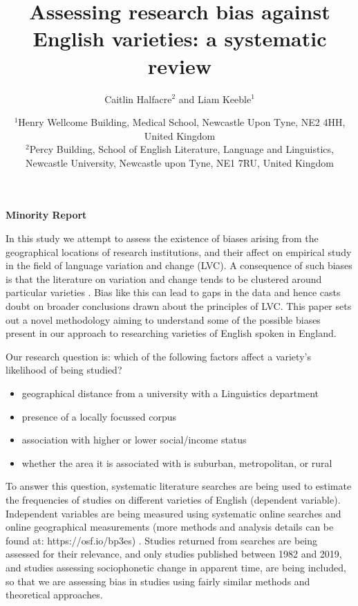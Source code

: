 \documentclass[12pt,a4paper]{article}
\title{Assessing research bias against English varieties: a systematic review}
\author{Caitlin Halfacre$^{2}$ and Liam Keeble$^{1}$}
\date{$^{1}$Henry Wellcome Building, Medical School, Newcastle Upon Tyne, NE2 4HH, United Kingdom\\
$^{2}$Percy Building, School of English Literature, Language and Linguistics, Newcastle University, Newcastle upon Tyne, NE1 7RU, United Kingdom\\}
\newcommand{\todocontentinline}[1]{\todo[color=RoyalPurple,inline]{#1}}
\begin{document}
\begin{center}
	\textbf{Minority Report}\\
\end{center}

\todocontentinline{Current word count 261}

In this study we attempt to assess the existence of biases arising from the geographical locations of research institutions, and their affect on empirical study in the field of language variation and change (LVC).  
A consequence of such biases is that the literature on variation and change tends to be clustered around particular varieties \cite{Trudgill2002}. Bias like this can lead to gaps in the data and hence casts doubt on broader conclusions drawn about the principles of LVC. This paper sets out a novel methodology aiming to understand some of the possible biases present in our approach to researching varieties of English spoken in England. 
	
Our research question is: which of the following factors affect a variety's likelihood of being studied?
	\begin{itemize}
		\item geographical distance from a university with a Linguistics department
		\item presence of a locally focussed corpus
		\item association with higher or lower social/income status
		\item whether the area it is associated with is suburban, metropolitan, or rural
	\end{itemize}


To answer this question, systematic literature searches \cite{lefebvre2019searching} are being used to estimate the frequencies of studies on different varieties of English (dependent variable). Independent variables are being measured using systematic online searches and online geographical measurements (more methods and analysis details can be found at: https://osf.io/bp3es) . Studies returned from searches are being assessed for their relevance, and only studies published between 1982 \citep{Wells1982b} and 2019, and studies assessing sociophonetic change in apparent time, are being included, so that we are assessing bias in studies using fairly similar methods and theoretical approaches.


\end{document}
